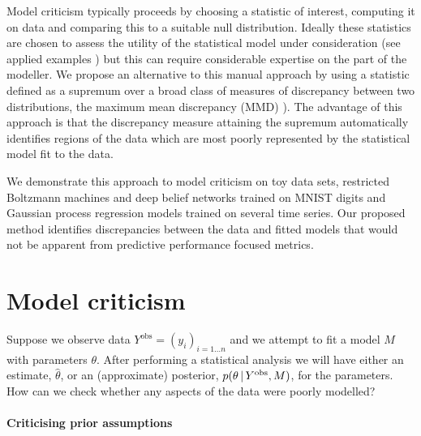 \documentclass{article} %
\begin{document}
Model criticism typically proceeds by choosing a statistic of interest, computing it on data and comparing this to a suitable null distribution.
Ideally these statistics are chosen to assess the utility of the statistical model under consideration (see applied examples \citep[e.g.][]{Gelman2013-st}) but this can require considerable expertise on the part of the modeller.
We propose an alternative to this manual approach by using a statistic defined as a supremum over a broad class of measures of discrepancy between two distributions, the maximum mean discrepancy (MMD) \citep[e.g.][]{Gretton2008-ik}).
The advantage of this approach is that the discrepancy measure attaining the supremum automatically identifies regions of the data which are most poorly represented by the statistical model fit to the data.

We demonstrate this approach to model criticism on toy data sets, restricted Boltzmann machines and deep belief networks trained on MNIST digits and Gaussian process regression models trained on several time series.
Our proposed method identifies discrepancies between the data and fitted models that would not be apparent from predictive performance focused metrics.

\section{Model criticism}
\label{sec:model-crit-general}

Suppose we observe data $Y^\textrm{obs} = (y_i)_{i=1\ldots n}$ and we attempt to fit a model $M$ with parameters $\theta$.
After performing a statistical analysis we will have either an estimate, $\hat\theta$, or an (approximate) posterior, $p(\theta \,|\, Y^\textrm{obs}, M)$, for the parameters.
How can we check whether any aspects of the data were poorly modelled?

\paragraph{Criticising prior assumptions}
\end{document}
